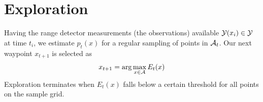 \section{Exploration}

Having the range detector measurements (the observations) available $\mathcal{Y}(x_i) \in \mathcal{Y}$ at time $t_i$, we 
estimate $p_t(x)$ for a regular sampling of points in $\mathcal{A}_t$.  Our next waypoint $x_{t+1}$ is selected as
\begin{equation}
 x_{t+1} = \arg\max_{x\in\mathcal{A}} E_t(x)
\end{equation}
Exploration terminates when $E_t(x)$ falls below a certain threshold for all points on the sample grid.

